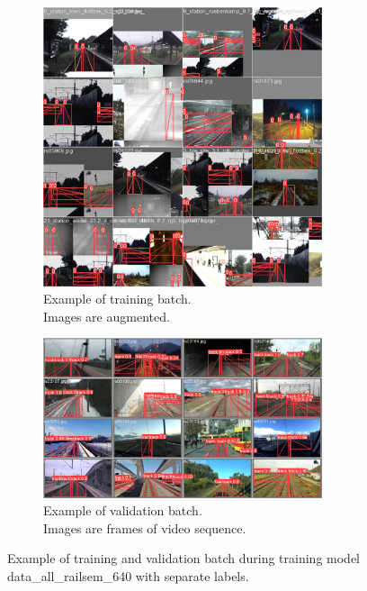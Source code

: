 \documentclass[Master,MDS,english]{BASE/twbook} %
\begin{document}
\begin{figure}
\centering
\begin{subfigure}[t]{.5\textwidth}
  \centering
  \includegraphics[width=0.9\textwidth]{images/yolo/all_nl/train_batch2}
  \caption{Example of training batch.\\ Images are augmented.}
    \label{fig:mosaic_augmentation_highres_all}
\end{subfigure}%
\begin{subfigure}[t]{.5\textwidth}
  \centering
  \includegraphics[width=0.9\textwidth]{images/yolo/all_nl/val_batch2_pred}
  \caption{Example of validation batch.\\ Images are frames of video sequence.}
\end{subfigure}
\caption{Example of training and validation batch during training model data\_all\_railsem\_640 with separate labels.}
\label{fig:yolo_all_example_nl}
\end{figure}
\end{document}
